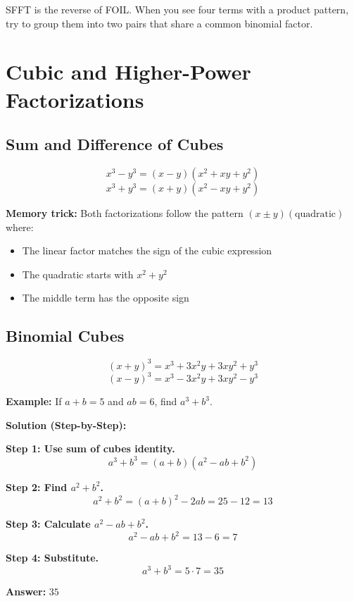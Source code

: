 \documentclass[12pt]{extarticle}
\begin{document}
\begin{remarkbox}
SFFT is the reverse of FOIL. When you see four terms with a product pattern, try to group them into two pairs that share a common binomial factor.
\end{remarkbox}

\section{Cubic and Higher-Power Factorizations}

\subsection*{Sum and Difference of Cubes}

\[
x^3 - y^3 = (x-y)(x^2+xy+y^2)
\]
\[
x^3 + y^3 = (x+y)(x^2-xy+y^2)
\]

\begin{remarkbox}
\textbf{Memory trick:} Both factorizations follow the pattern $(x \pm y)(\text{quadratic})$ where:
\begin{itemize}
    \item The linear factor matches the sign of the cubic expression
    \item The quadratic starts with $x^2 + y^2$
    \item The middle term has the opposite sign
\end{itemize}
\end{remarkbox}

\subsection*{Binomial Cubes}

\[
(x+y)^3 = x^3 + 3x^2y + 3xy^2 + y^3
\]
\[
(x-y)^3 = x^3 - 3x^2y + 3xy^2 - y^3
\]

\begin{examplebox}
\textbf{Example:} If $a+b = 5$ and $ab = 6$, find $a^3+b^3$.

\textbf{Solution (Step-by-Step):}

\textbf{Step 1: Use sum of cubes identity.}
\[
a^3 + b^3 = (a+b)(a^2 - ab + b^2)
\]

\textbf{Step 2: Find $a^2+b^2$.}
\[
a^2 + b^2 = (a+b)^2 - 2ab = 25 - 12 = 13
\]

\textbf{Step 3: Calculate $a^2 - ab + b^2$.}
\[
a^2 - ab + b^2 = 13 - 6 = 7
\]

\textbf{Step 4: Substitute.}
\[
a^3 + b^3 = 5 \cdot 7 = 35
\]

\textbf{Answer:} $\boxed{35}$
\end{examplebox}
\end{document}
